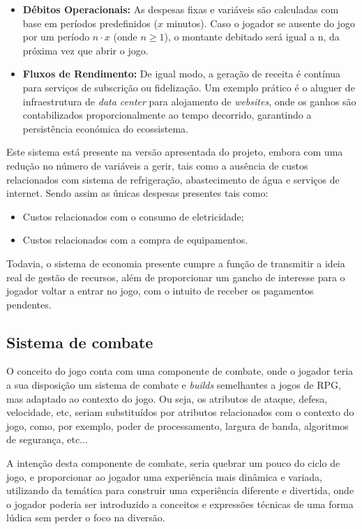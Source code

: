 \begin{itemize}
    \item \textbf{Débitos Operacionais:} As despesas fixas e variáveis são calculadas com base em períodos predefinidos ($x$ minutos). Caso o jogador se ausente do jogo por um período $n \cdot x$ (onde $n \geq 1$), o montante debitado será igual a n, da próxima vez que abrir o jogo.
    \item \textbf{Fluxos de Rendimento:} De igual modo, a geração de receita é contínua para serviços de subscrição ou fidelização. Um exemplo prático é o aluguer de infraestrutura de \textit{data center} para alojamento de \textit{websites}, onde os ganhos são contabilizados proporcionalmente ao tempo decorrido, garantindo a persistência económica do ecossistema.
\end{itemize}

Este sistema está presente na versão apresentada do projeto, embora com uma
redução no número de variáveis a gerir, tais como a ausência de custos relacionados
com sistema de refrigeração, abastecimento de água e serviços de internet.
Sendo assim as únicas despesas presentes tais como:
\begin{itemize}
    \item Custos relacionados com o consumo de eletricidade;
    \item Custos relacionados com a compra de equipamentos.
\end{itemize}

Todavia, o sistema de economia presente cumpre a função de transmitir
a ideia real de gestão de recursos, além de proporcionar um gancho de interesse para
o jogador voltar a entrar no jogo, com o intuito de receber os pagamentos pendentes.

\subsection{Sistema de combate}

O conceito do jogo conta com uma componente de combate, onde o jogador teria
a sua disposição um sistema de combate e \textit{builds} semelhantes a jogos de \ac{RPG},
mas adaptado ao contexto do jogo. Ou seja, os atributos de ataque, defesa,
velocidade, etc, seriam substituídos por atributos relacionados com o 
contexto do jogo, como, por exemplo, poder de processamento, largura de banda,
algoritmos de segurança, etc...

A intenção desta componente de combate, seria quebrar um pouco do ciclo de jogo,
e proporcionar ao jogador uma experiência mais dinâmica e variada, utilizando da temática
para construir uma experiência diferente e divertida, onde o jogador
poderia ser introduzido a conceitos e expressões técnicas de uma forma lúdica
sem perder o foco na diversão.

